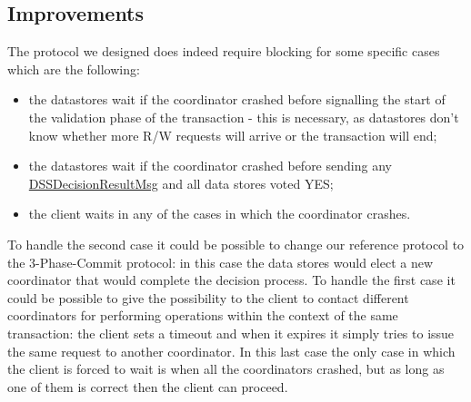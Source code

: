 \subsection{Improvements}
The protocol we designed does indeed require blocking for some specific cases which are the following:
\begin{itemize}
    \item the datastores wait if the coordinator crashed before signalling the start of the validation phase of the transaction - this is necessary, as datastores don't know whether more R/W requests will arrive or the transaction will end;
    \item the datastores wait if the coordinator crashed before sending any \url{DSSDecisionResultMsg} and all data stores voted YES;
    \item the client waits in any of the cases in which the coordinator crashes.
\end{itemize}
To handle the second case it could be possible to change our reference protocol to the 3-Phase-Commit protocol: in this case the data stores would elect a new coordinator that would complete the decision process.
\newline
To handle the first case it could be possible to give the possibility to the client to contact different coordinators for performing operations within the context of the same transaction: the client sets a timeout and when it expires it simply tries to issue the same request to another coordinator. In this last case the only case in which the client is forced to wait is when all the coordinators crashed, but as long as one of them is correct then the client can proceed.